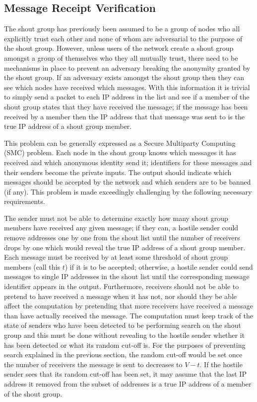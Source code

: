 \documentclass[ %
                    author={Luke Murray},
                supervisor={Dr. Simon Hollis},
                     title={Shadow Peer-to-Peer Networks},
                  subtitle={},
                    degree={MEng},
                      year={2013} ]{thesis}
\begin{document}
\subsection{Message Receipt Verification}

The shout group has previously been assumed to be a group of nodes who all explicitly trust each other and none of whom are adversarial to the purpose of the shout group. However, unless users of the network create a shout group amongst a group of themselves who they all mutually trust, there need to be mechanisms in place to prevent an adversary breaking the anonymity granted by the shout group. If an adversary exists amongst the shout group then they can see which nodes have received which messages. With this information it is trivial to simply send a packet to each IP address in the list and see if a member of the shout group states that they have received the message; if the message has been received by a member then the IP address that that message was sent to is the true IP address of a shout group member.

This problem can be generally expressed as a Secure Multiparty Computing (SMC) problem\cite{goldreich1998secure}. Each node in the shout group knows which messages it has received and which anonymous identity send it; identifiers for these messages and their senders become the private inputs. The output should indicate which messages should be accepted by the network and which senders are to be banned (if any). This problem is made exceedingly challenging by the following necessary requirements.

The sender must not be able to determine exactly how many shout group members have received any given message; if they can, a hostile sender could remove addresses one by one from the shout list until the number of receivers drops by one which would reveal the true IP address of a shout group member. Each message must be received by at least some threshold of shout group members (call this $t$) if it is to be accepted; otherwise, a hostile sender could send messages to single IP addresses in the shout list until the corresponding message identifier appears in the output. Furthermore, receivers should not be able to pretend to have received a message when it has not, nor should they be able affect the computation by pretending that more receivers have received a message than have actually received the message. The computation must keep track of the state of senders who have been detected to be performing search on the shout group and this must be done without revealing to the hostile sender whether it has been detected or what its random cut-off is. For the purposes of preventing search explained in the previous section, the random cut-off would be set once the number of receivers the message is sent to decreases to $V - t$. If the hostile sender sees that its random cut-off has been set, it may assume that the last IP address it removed from the subset of addresses is a true IP address of a member of the shout group. 
\end{document}
